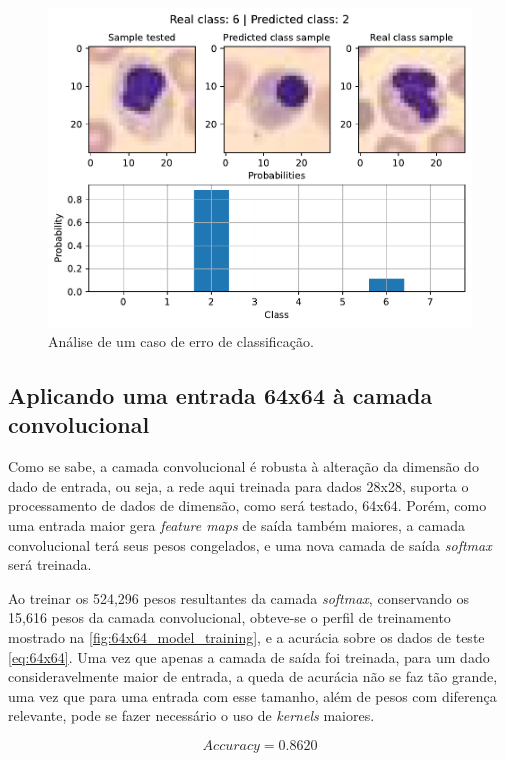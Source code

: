 \begin{figure}[H]
\centering
\includegraphics[width=0.75\linewidth]{../../plot/cnn_shallow/error_analyser_62}
\caption{Análise de um caso de erro de classificação.}
\label{fig:error_analyser_62_cnn}
\end{figure}


\subsection{Aplicando uma entrada 64x64 à camada convolucional}

Como se sabe, a camada convolucional é robusta à alteração da dimensão do dado de entrada, ou seja, a rede aqui treinada para dados 28x28, suporta o processamento de dados de dimensão, como será testado, 64x64. Porém, como uma entrada maior gera \textit{feature maps} de saída também maiores, a camada convolucional terá seus pesos congelados, e uma nova camada de saída \textit{softmax} será treinada.

Ao treinar os 524,296 pesos resultantes da camada \textit{softmax}, conservando os 15,616 pesos da camada convolucional, obteve-se o perfil de treinamento mostrado na \autoref{fig:64x64_model_training}, e a acurácia sobre os dados de teste  \eqref{eq:64x64}. Uma vez que apenas a camada de saída foi treinada, para um dado consideravelmente maior de entrada, a queda de acurácia não se faz tão grande, uma vez que para uma entrada com esse tamanho, além de pesos com diferença relevante, pode se fazer necessário o uso de \textit{kernels} maiores. 

\begin{equation}\label{eq:64x64}
	Accuracy = 0.8620
\end{equation}

